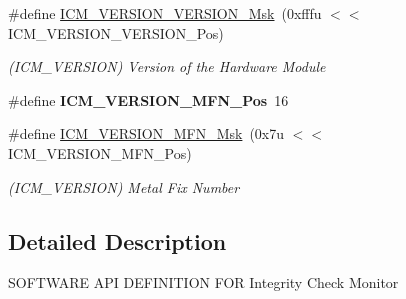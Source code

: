 \begin{DoxyCompactItemize}
\mbox{\label{group__SAMV71__ICM_gae1c97b9212df2e0a3972dccd93a28569}} 
\#define \mbox{\hyperlink{group__SAMV71__ICM_gae1c97b9212df2e0a3972dccd93a28569}{I\+C\+M\+\_\+\+V\+E\+R\+S\+I\+O\+N\+\_\+\+V\+E\+R\+S\+I\+O\+N\+\_\+\+Msk}}~(0xfffu $<$$<$ I\+C\+M\+\_\+\+V\+E\+R\+S\+I\+O\+N\+\_\+\+V\+E\+R\+S\+I\+O\+N\+\_\+\+Pos)
\begin{DoxyCompactList}\small\item\em (I\+C\+M\+\_\+\+V\+E\+R\+S\+I\+ON) Version of the Hardware Module \end{DoxyCompactList}\item 
\mbox{\label{group__SAMV71__ICM_ga95eb208c8be1cbea0e356e363163506e}} 
\#define {\bfseries I\+C\+M\+\_\+\+V\+E\+R\+S\+I\+O\+N\+\_\+\+M\+F\+N\+\_\+\+Pos}~16
\item 
\mbox{\label{group__SAMV71__ICM_ga70cbabfbfd250fea3c2294899440bc81}} 
\#define \mbox{\hyperlink{group__SAMV71__ICM_ga70cbabfbfd250fea3c2294899440bc81}{I\+C\+M\+\_\+\+V\+E\+R\+S\+I\+O\+N\+\_\+\+M\+F\+N\+\_\+\+Msk}}~(0x7u $<$$<$ I\+C\+M\+\_\+\+V\+E\+R\+S\+I\+O\+N\+\_\+\+M\+F\+N\+\_\+\+Pos)
\begin{DoxyCompactList}\small\item\em (I\+C\+M\+\_\+\+V\+E\+R\+S\+I\+ON) Metal Fix Number \end{DoxyCompactList}\end{DoxyCompactItemize}


\subsection{Detailed Description}
S\+O\+F\+T\+W\+A\+RE A\+PI D\+E\+F\+I\+N\+I\+T\+I\+ON F\+OR Integrity Check Monitor 
